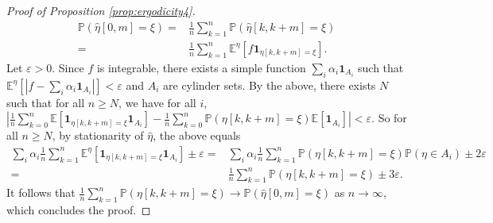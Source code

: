 \documentclass{article}
\renewcommand{\P}{\mathbb{P}}
\newcommand{\E}{\mathbb{E}}
\newcommand{\1}{\mathbf{1}}
\newcommand{\heta}{\hat\eta}
\theoremstyle{definition}
\numberwithin{equation}{section}
\numberwithin{theorem}{section}
\begin{document}
\begin{proof}[Proof of Proposition \ref{prop:ergodicity4}]
\begin{equation}
    \begin{split}
        \P(\heta[0,m]=\xi)=&\frac{1}{n}\sum_{k=1}^n\P(\heta[k,k+m]=\xi)\\
        =&\frac{1}{n}\sum_{k=1}^n\E^{\eta}[f\1_{\eta[k,k+m]=\xi}].
    \end{split}
\end{equation}
Let $\varepsilon>0$. Since $f$ is integrable, there exists a simple function $\sum_i\alpha_i\1_{A_i}$ such that $\E^{\eta}[|f-\sum_{i}\alpha_i\1_{A_i}|]<\varepsilon$ and $A_i$ are cylinder sets. By the above, there exists $N$ such that for all $n\geq N$, we have for all $i$, $|\frac{1}{n}\sum_{k=0}^n\E[\1_{\eta[k,k+m]=\xi}\1_{A_i}]-\frac{1}{n}\sum_{k=0}^n\P(\eta[k,k+m]=\xi)\E[\1_{A_i}]|<\varepsilon$. So for all $n\geq N$, by stationarity of $\heta$, the above equals
\begin{equation}
    \begin{split}
        \sum_i\alpha_i\frac{1}{n}\sum_{k=1}^n\E^{\eta}[\1_{\eta[k,k+m]=\xi}\1_{A_i}]\pm\varepsilon
        =&\sum_i\alpha_i\frac{1}{n}\sum_{k=1}^n\P(\eta[k,k+m]=\xi)\P(\eta\in A_i)\pm2\varepsilon\\
        =&\frac{1}{n}\sum_{k=1}^n\P(\eta[k,k+m]=\xi)\pm3\varepsilon.
    \end{split}
\end{equation}
It follows that $\frac{1}{n}\sum_{k=1}^n\P(\eta[k,k+m]=\xi)\rightarrow\P(\heta[0,m]=\xi)$ as $n\rightarrow\infty$, which concludes the proof.
\end{proof}
\end{document}
